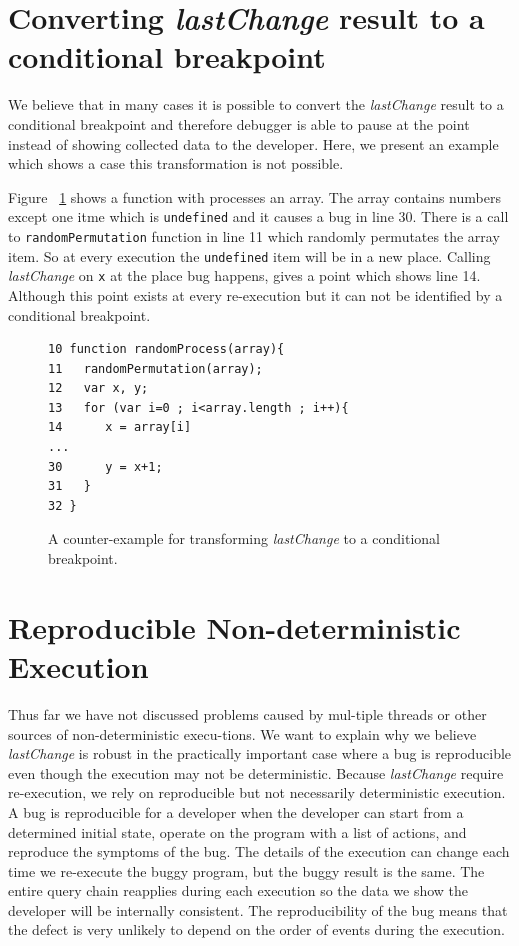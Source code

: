\documentclass[preprint]{sigplanconf}
\begin{document}
\section{Converting \textit{lastChange} result to a conditional breakpoint}
We believe that in many cases it is possible to convert the \textit{lastChange} result to a conditional breakpoint and therefore debugger is able to pause at the point
 instead of showing collected data to the developer. Here, we present an example which shows a case this transformation is not possible.

Figure ~\ref{fig:counter-example} shows a function with processes an array. The array contains numbers except one itme which is \texttt{undefined} and it causes a bug in line 30. There is a call to \texttt{randomPermutation} function in line 11 which randomly permutates the array item. So at every execution the \texttt{undefined} item will be in a new place. Calling \textit{lastChange} on \texttt{x} at the place bug happens, gives a point which shows line 14. Although this point exists at every re-execution but it can not be identified by a conditional breakpoint. 

\begin{figure}[htp]
\begin{verbatim}
10 function randomProcess(array){
11   randomPermutation(array);
12   var x, y;
13   for (var i=0 ; i<array.length ; i++){
14      x = array[i]
...
30      y = x+1;
31   }
32 }
\end{verbatim}
\caption{A counter-example for transforming \textit{lastChange} to a conditional breakpoint.}
\label{fig:counter-example}
\end{figure}
 

\section{Reproducible Non-deterministic Execution}
Thus far we have not discussed problems caused by mul-tiple threads or other sources of non-deterministic execu-tions. We want to explain why we believe \textit{lastChange} is robust in the practically important case where a bug is reproducible even though the execution may not be deterministic. 
Because \textit{lastChange} require re-execution, we rely on reproducible but not necessarily deterministic execution. A bug is reproducible for a developer when the developer can start from a determined initial state, operate on the program with a list of actions, and reproduce the symptoms of the bug. The details of the execution can change each time we re-execute the buggy program, but the buggy result is the same. The entire query chain reapplies during each execution so the data we show the developer will be internally consistent. The reproducibility of the bug means that the defect is very unlikely to depend on the order of events during the execution.
\end{document}
